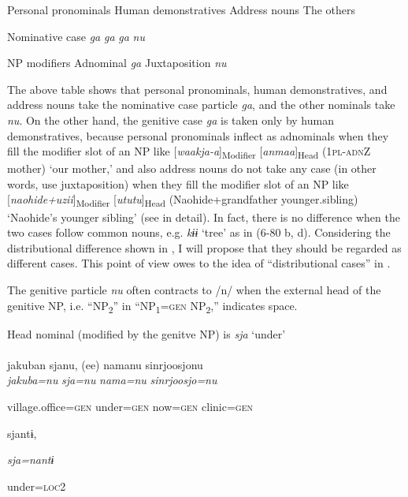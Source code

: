   Personal pronominals  Human demonstratives  Address nouns  The others

Nominative case  \textit{ga}  \textit{ga}  \textit{ga}  \textit{nu}

NP modifiers  Adnominal  \textit{ga}  Juxtaposition  \textit{nu}

The above table shows that personal pronominals, human demonstratives, and address nouns take the nominative case particle \textit{ga}, and the other nominals take \textit{nu}. On the other hand, the genitive case \textit{ga} is taken only by human demonstratives, because personal pronominals inflect as adnominals when they fill the modifier slot of an NP like [\textit{waakja-a}]\textsubscript{Modifier} [\textit{anmaa}]\textsubscript{Head} (1\textsc{pl}-\textsc{adn}Z mother) ‘our mother,’ and also address nouns do not take any case (in other words, use juxtaposition) when they fill the modifier slot of an NP like [\textit{naohide+uzii}]\textsubscript{Modifier} [\textit{ututu}]\textsubscript{Head} (Naohide+grandfather younger.sibling) ‘Naohide’s younger sibling’ (see  in detail). In fact, there is no difference when the two cases follow common nouns, e.g. \textit{kɨɨ} ‘tree’ as in (6-80 b, d). Considering the distributional difference shown in , I will propose that they should be regarded as different cases. This point of view owes to the idea of “distributional cases” in \citet{Comrie1991}.

  The genitive particle \textit{nu} often contracts to /n/ when the external head of the genitive NP, i.e. “NP\textsubscript{2}” in “NP\textsubscript{1}=\textsc{gen} NP\textsubscript{2},” indicates space.

\ea\label{ex:6-81}
 Head nominal (modified by the genitve NP) is \textit{sja} ‘under’\\

 \ea{}\\
\gll  {\TM}  jakuban  sjanu,  (ee)  namanu  {\textbar}sinrjoosjo{\textbar}nu\\

      \textit{jakuba=nu}  \textit{sja=nu}    \textit{nama=nu}  \textit{sinrjoosjo=nu}

      village.office=\textsc{gen}  under=\textsc{gen}    now=\textsc{gen}  clinic=\textsc{gen}

      sjantɨ,

      \textit{sja=nantɨ}

      under=\textsc{loc}2

